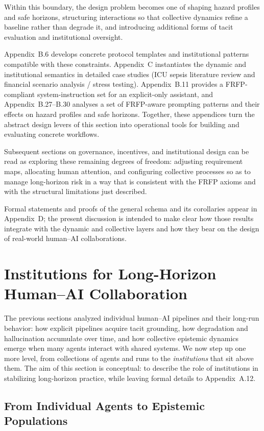 Within this boundary, the design problem becomes one of shaping hazard profiles and safe horizons, structuring interactions so that collective dynamics refine a baseline rather than degrade it, and introducing additional forms of tacit evaluation and institutional oversight.

Appendix~B.6 develops concrete protocol templates and institutional patterns compatible with these constraints. Appendix~C instantiates the dynamic and institutional semantics in detailed case studies (ICU sepsis literature review and financial scenario analysis / stress testing). Appendix~B.11 provides a FRFP-compliant system-instruction set for an explicit-only assistant, and Appendix~B.27--B.30 analyses a set of FRFP-aware prompting patterns and their effects on hazard profiles and safe horizons. Together, these appendices turn the abstract design levers of this section into operational tools for building and evaluating concrete workflows.

Subsequent sections on governance, incentives, and institutional design can be read as exploring these remaining degrees of freedom: adjusting requirement maps, allocating human attention, and configuring collective processes so as to manage long-horizon risk in a way that is consistent with the FRFP axioms and with the structural limitations just described.

Formal statements and proofs of the general schema and its corollaries appear in Appendix~D; the present discussion is intended to make clear how those results integrate with the dynamic and collective layers and how they bear on the design of real-world human--AI collaborations.
\section{Institutions for Long-Horizon Human--AI Collaboration}
\label{sec:institutions-main}

The previous sections analyzed individual human--AI pipelines and their long-run behavior: how explicit pipelines acquire tacit grounding, how degradation and hallucination accumulate over time, and how collective epistemic dynamics emerge when many agents interact with shared systems. We now step up one more level, from collections of agents and runs to the \emph{institutions} that sit above them. The aim of this section is conceptual: to describe the role of institutions in stabilizing long-horizon practice, while leaving formal details to Appendix~A.12.

\subsection{From Individual Agents to Epistemic Populations}

